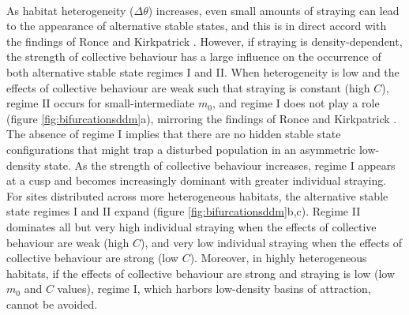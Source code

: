 \documentclass{revtex4}
\begin{document}
\\
As habitat heterogeneity ($\Delta\theta$) increases, even small amounts of straying can lead to the appearance of alternative stable states, and this is in direct accord with the findings of Ronce and Kirkpatrick \citep{Ronce:2001dp}.
However, if straying is density-dependent, the strength of collective behaviour has a large influence on the occurrence of both alternative stable state regimes I and II.
When heterogeneity is low and the effects of collective behaviour are weak such that straying is constant (high $C$), regime II occurs for small-intermediate $m_0$, and regime I does not play a role (figure \ref{fig:bifurcationsddm}a), mirroring the findings of Ronce and Kirkpatrick \citep{Ronce:2001dp}.
The absence of regime I implies that there are no hidden stable state configurations that might trap a disturbed population in an asymmetric low-density state.
As the strength of collective behaviour increases, regime I appears at a cusp and becomes increasingly dominant with greater individual straying.
For sites distributed across more heterogeneous habitats, the alternative stable state regimes I and II expand (figure \ref{fig:bifurcationsddm}b,c).
Regime II dominates all but very high individual straying when the effects of collective behaviour are weak (high $C$), and very low individual straying when the effects of collective behaviour are strong (low $C$).
Moreover, in highly heterogeneous habitats, if the effects of collective behaviour are strong and straying is low (low $m_0$ and $C$ values), regime I, which harbors low-density basins of attraction, cannot be avoided.
\end{document}
